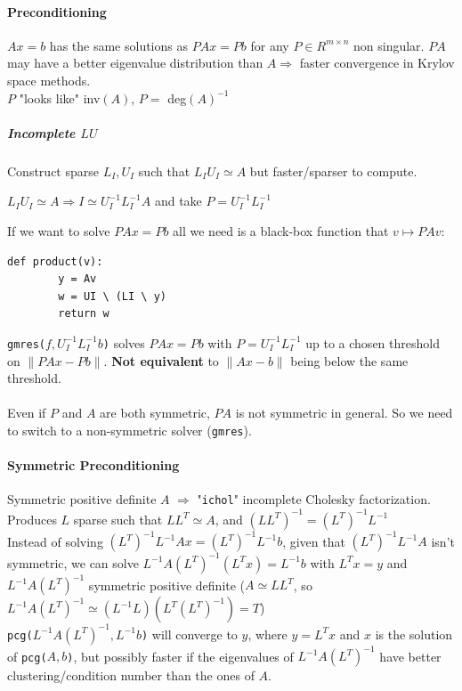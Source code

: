 \documentclass[10pt]{report}
\begin{document}
\paragraph{Preconditioning} $Ax=b$ has the same solutions as $PAx = Pb$ for any $P\in R^{m\times n}$ non singular. $PA$ may have a better eigenvalue distribution than $A\Rightarrow$ faster convergence in Krylov space methods.\\
$P$ "looks like" inv$(A)$, $P =$ deg$(A)^{-1}$ %
\subparagraph{Incomplete $LU$} Construct sparse $L_I, U_I$ such that $L_IU_I\simeq A$ but faster/sparser to compute.\begin{list}{}{}
	\item $L_IU_I\simeq A \Rightarrow I \simeq U_I^{-1}L_I^{-1}A$ and take $P = U_I^{-1}L_I^{-1}$
\end{list}
If we want to solve $PAx=Pb$ all we need is a black-box function that $v\mapsto PAv$:
\begin{lstlisting}[style=myPython]
	def product(v):
		y = Av
		w = UI \ (LI \ y)
		return w
\end{lstlisting}
\texttt{gmres($f, U_I^{-1}L_I^{-1}b$)} solves $PAx=Pb$ with $P = U_I^{-1}L_I^{-1}$ up to a chosen threshold on $\|PAx-Pb\|$. \textbf{Not equivalent} to $\|Ax-b\|$ being below the same threshold.\\\\
Even if $P$ and $A$ are both symmetric, $PA$ is not symmetric in general. So we need to switch to a non-symmetric solver (\texttt{gmres}).
\paragraph{Symmetric Preconditioning} Symmetric positive definite $A$ $\Rightarrow$ "\texttt{ichol}" incomplete Cholesky factorization. Produces $L$ sparse such that $LL^T\simeq A$, and $(LL^T)^{-1}=(L^T)^{-1}L^{-1}$\\
Instead of solving $(L^T)^{-1}L^{-1}Ax = (L^T)^{-1}L^{-1}b$, given that $(L^T)^{-1}L^{-1}A$ isn't symmetric, we can solve $L^{-1}A(L^T)^{-1}(L^Tx) = L^{-1}b$ with $L^Tx=y$ and $L^{-1}A(L^T)^{-1}$ symmetric positive definite ($A\simeq LL^T$, so $L^{-1}A(L^T)^{-1}\simeq(L^{-1}L)(L^T(L^T)^{-1}) = T$)\\
\texttt{pcg($L^{-1}A(L^T)^{-1},L^{-1}b$)} will converge to $y$, where $y=L^Tx$ and $x$ is the solution of \texttt{pcg($A,b$)}, but possibly faster if the eigenvalues of $L^{-1}A(L^T)^{-1}$ have better clustering/condition number than the ones of $A$.
\end{document}
